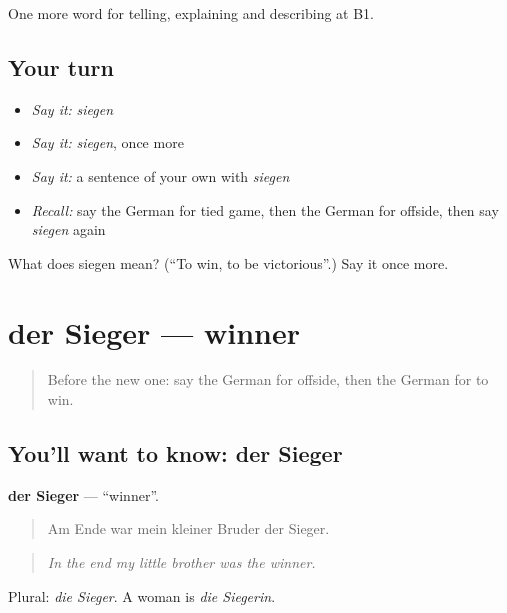 \begin{grammarlens}[title={What you've built}]
One more word for telling, explaining and describing at B1.
\end{grammarlens}

\subsection*{Your turn}
\begin{itemize}
\raggedright
  \item \emph{Say it:} \emph{siegen}
  \item \emph{Say it:} \emph{siegen}, once more
  \item \emph{Say it:} a sentence of your own with \emph{siegen}
  \item \emph{Recall:} say the German for tied game, then the German for offside, then say \emph{siegen} again
\end{itemize}

\begin{tcolorbox}[breakable,colback=teal!4,colframe=teal!35!black,title={Before you move on}]
What does siegen mean? (\textquotedblleft{}To win, to be victorious\textquotedblright{}.) Say it once more.
\end{tcolorbox}
\section[der Sieger]{der Sieger — winner}

\label{lesson:GE-C508-sieger}



\begin{quote}
Before the new one: say the German for offside, then the German for to win.
\end{quote}

\subsection*{You'll want to know: der Sieger}
\textbf{der Sieger} — \textquotedblleft{}winner\textquotedblright{}.

\begin{quote}
Am Ende war mein kleiner Bruder der Sieger.
\end{quote}

\begin{quote}
\emph{In the end my little brother was the winner.}
\end{quote}

Plural: \emph{die Sieger}. A woman is \emph{die Siegerin}.

